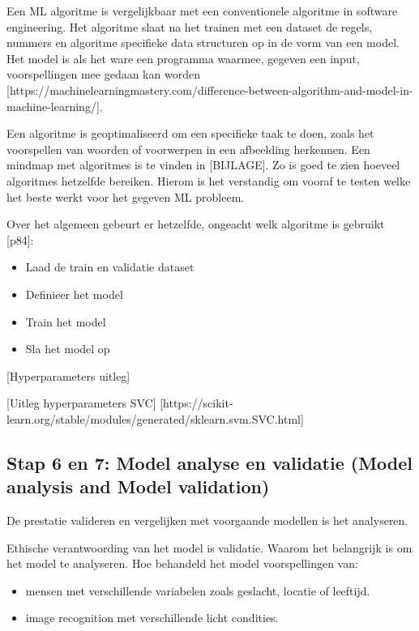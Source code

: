 Een ML algoritme is vergelijkbaar met een conventionele algoritme in software engineering. Het algoritme slaat na het trainen met een dataset de regels, nummers en algoritme specifieke data structuren op in de vorm van een model. Het model is als het ware een programma waarmee, gegeven een input, voorspellingen mee gedaan kan worden [https://machinelearningmastery.com/difference-between-algorithm-and-model-in-machine-learning/].



Een algoritme is geoptimaliseerd om een specifieke taak te doen, zoals het voorspellen van woorden of voorwerpen in een afbeelding herkennen. Een mindmap met algoritmes is te vinden in [BIJLAGE]. Zo is goed te zien hoeveel algoritmes hetzelfde bereiken. Hierom is het verstandig om vooraf te testen welke het beste werkt voor het gegeven ML probleem.

Over het algemeen gebeurt er hetzelfde, ongeacht welk algoritme is gebruikt [p84]:

\begin{itemize}
  \item Laad de train en validatie dataset
  \item Definieer het model
  \item Train het model
  \item Sla het model op
\end{itemize}

[Hyperparameters uitleg]

[Uitleg hyperparameters SVC] [https://scikit-learn.org/stable/modules/generated/sklearn.svm.SVC.html]

\subsection{Stap 6 en 7: Model analyse en validatie (Model analysis and Model validation)}\label{subsec:model-analyse-en-validatie}
De prestatie valideren en vergelijken met voorgaande modellen is het analyseren. 

Ethische verantwoording van het model is validatie. Waarom het belangrijk is om het model te analyseren. Hoe behandeld het model voorspellingen van:

\begin{itemize}
  \item mensen met verschillende variabelen zoals geslacht, locatie of leeftijd.
  \item image recognition met verschillende licht condities.
\end{itemize}


